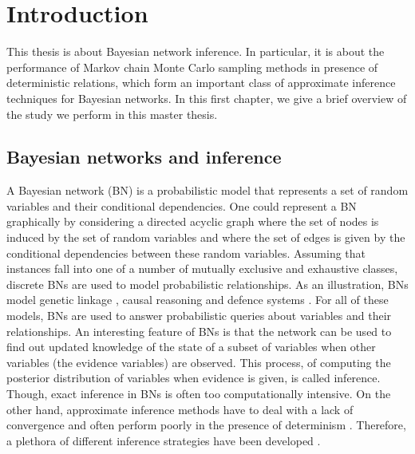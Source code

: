 \documentclass[a4paper, twoside, 11pt]{report}
\theoremstyle{plain}
\theoremstyle{definition}
\theoremstyle{remark}
\begin{document}

\tableofcontents

\clearpage


\restoregeometry



\chapter{Introduction}\label{intro}
This thesis is about Bayesian network inference. In particular, it is about the performance of Markov chain Monte Carlo sampling methods in presence of deterministic relations, which form an important class of approximate inference techniques for Bayesian networks. In this first chapter, we give a brief overview of the study we perform in this master thesis.

\section{Bayesian networks and inference}
A Bayesian network (BN) is a probabilistic model that represents a set of random variables and their conditional dependencies. One could represent a BN graphically by considering a directed acyclic graph where the set of nodes is induced by the set of random variables and where the set of edges is given by the conditional dependencies between these random variables. Assuming that instances fall into one of a number of mutually exclusive and exhaustive classes, discrete BNs are used to model probabilistic relationships. As an illustration, BNs model genetic linkage \cite{fishelson2004}, causal reasoning \cite{pearl2014probabilistic} and defence systems \cite{phillipson2015modelling}. For all of these models, BNs are used to answer probabilistic queries about variables and their relationships. An interesting feature of BNs is that the network can be used to find out updated knowledge of the state of a subset of variables when other variables (the evidence variables) are observed. This process, of computing the posterior distribution of variables when evidence is given, is called inference. Though, exact inference in BNs is often too computationally intensive. On the other hand, approximate inference methods have to deal with a lack of convergence and often perform poorly in the presence of determinism \cite{koller2009probabilistic, poon2006sound, gogate2011samplesearch}. Therefore, a plethora of different inference strategies have been developed \cite{nasrabadi2007pattern, nielsen2009bayesian, koller2009probabilistic, pearl2014probabilistic}.
\end{document}
